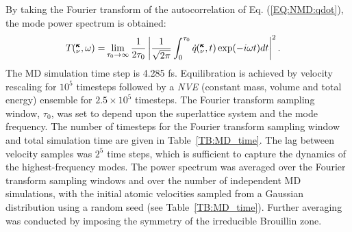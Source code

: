 \documentclass[aps,prb,preprint,preprintnumbers,amsmath,amssymb,floatfix,superscriptaddress]{revtex4}
\newcommand{\kvt}{\mspace{-4.0mu}\left(\mspace{-8.0mu}
\begin{smallmatrix}&\pmb{\kappa} \\&\nu\end{smallmatrix}
\mspace{-2.0mu},t\right)}
\newcommand{\kvw}{\mspace{-4.0mu}\left(\mspace{-8.0mu}
\begin{smallmatrix}&\pmb{\kappa} \\&\nu\end{smallmatrix}
\mspace{-2.0mu},\omega\right)}
\begin{document}
By taking the Fourier transform of the autocorrelation of Eq. (\ref{EQ:NMD:qdot}), the mode power spectrum is obtained: \cite{dove_introduction_1993-3}
\begin{equation}\label{EQ:NMD:SED}
\begin{split}
T\kvw=&\lim_{\tau_0\rightarrow\infty}\frac{1}{2\tau_0}\left|\frac{1}{\sqrt{2\pi}}\int_{0}^{\tau_0}\dot{q}\kvt\exp(-i\omega t)dt\right|^2.
\end{split}
\end{equation}
The MD simulation time step is 4.285 fs. Equilibration is achieved by velocity rescaling for $10^5$ timesteps followed by a \textit{NVE} (constant mass, volume and total energy) ensemble for $2.5 \times10^5$ timesteps. The Fourier transform sampling window, $\tau_0$, was set to depend upon the superlattice system and the mode frequency. The number of timesteps for the Fourier transform sampling window and total simulation time are given in Table~\ref{TB:MD_time}. The lag between velocity samples was $2^5$ time steps, which is sufficient to capture the dynamics of the highest-frequency modes. The power spectrum was averaged over the Fourier transform sampling windows and over the number of independent MD simulations, with the initial atomic velocities sampled from a Gaussian distribution using a random seed (see Table~\ref{TB:MD_time}). Further averaging was conducted by imposing the symmetry of the irreducible Brouillin zone. 
\end{document}
